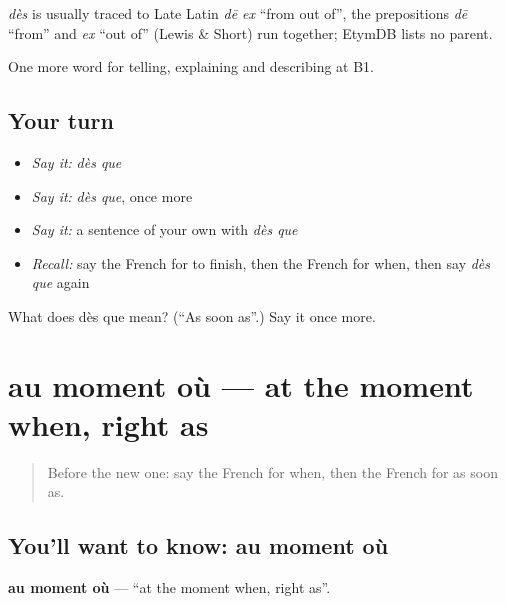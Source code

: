 \begin{cousinweb}
\emph{dès} is usually traced to Late Latin \emph{dē ex} \textquotedblleft{}from out of\textquotedblright{}, the prepositions \emph{dē} \textquotedblleft{}from\textquotedblright{} and \emph{ex} \textquotedblleft{}out of\textquotedblright{} (Lewis \& Short) run together; EtymDB lists no parent.
\end{cousinweb}

\begin{grammarlens}[title={What you've built}]
One more word for telling, explaining and describing at B1.
\end{grammarlens}

\subsection*{Your turn}
\begin{itemize}
\raggedright
  \item \emph{Say it:} \emph{dès que}
  \item \emph{Say it:} \emph{dès que}, once more
  \item \emph{Say it:} a sentence of your own with \emph{dès que}
  \item \emph{Recall:} say the French for to finish, then the French for when, then say \emph{dès que} again
\end{itemize}

\begin{tcolorbox}[breakable,colback=teal!4,colframe=teal!35!black,title={Before you move on}]
What does dès que mean? (\textquotedblleft{}As soon as\textquotedblright{}.) Say it once more.
\end{tcolorbox}
\section[au moment où]{au moment où — at the moment when, right as}

\label{lesson:FR-C269-au-moment-ou}



\begin{quote}
Before the new one: say the French for when, then the French for as soon as.
\end{quote}

\subsection*{You'll want to know: au moment où}
\textbf{au moment où} — \textquotedblleft{}at the moment when, right as\textquotedblright{}.

